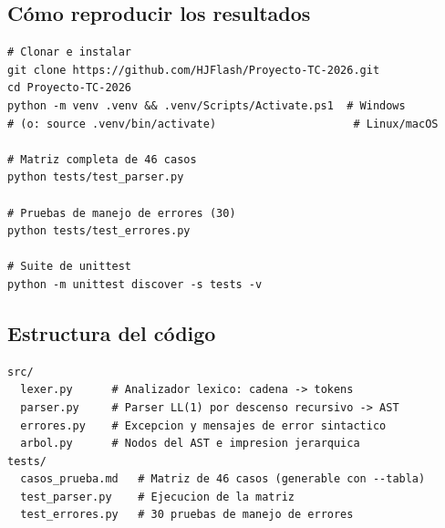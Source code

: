 \documentclass[12pt,a4paper]{article}
\begin{document}
\subsection{Cómo reproducir los resultados}
\label{sec:anexo-reproduccion}
\begin{lstlisting}
# Clonar e instalar
git clone https://github.com/HJFlash/Proyecto-TC-2026.git
cd Proyecto-TC-2026
python -m venv .venv && .venv/Scripts/Activate.ps1  # Windows
# (o: source .venv/bin/activate)                     # Linux/macOS

# Matriz completa de 46 casos
python tests/test_parser.py

# Pruebas de manejo de errores (30)
python tests/test_errores.py

# Suite de unittest
python -m unittest discover -s tests -v
\end{lstlisting}

\subsection{Estructura del código}
\begin{lstlisting}
src/
  lexer.py      # Analizador lexico: cadena -> tokens
  parser.py     # Parser LL(1) por descenso recursivo -> AST
  errores.py    # Excepcion y mensajes de error sintactico
  arbol.py      # Nodos del AST e impresion jerarquica
tests/
  casos_prueba.md   # Matriz de 46 casos (generable con --tabla)
  test_parser.py    # Ejecucion de la matriz
  test_errores.py   # 30 pruebas de manejo de errores
\end{lstlisting}
\end{document}
